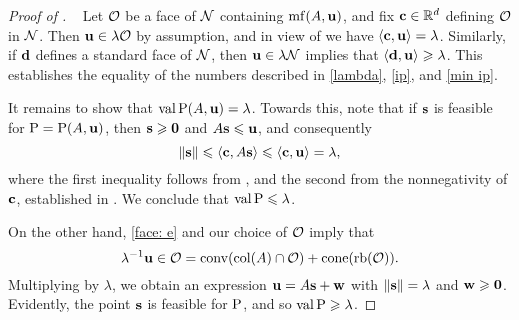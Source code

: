 \documentclass[11pt]{amsart}
\begin{document}
\begin{proof}[Proof of ]
   \ 
   Let $\mathcal{O}$ be a face of $\mathcal{N}$ containing $\operatorname{mf}(A,\mathbf{u})$, and fix $\mathbf{c} \in \mathbb{R}^d$ defining $\mathcal{O}$ in $\mathcal{N}$.
   Then $\mathbf{u} \in \lambda \mathcal{O}$ by assumption, and in view of  we have $\langle \mathbf{c}, \mathbf{u} \rangle = \lambda$.
   Similarly, if $\mathbf{d}$ defines a standard face of $\mathcal{N}$, then $\mathbf{u} \in \lambda \mathcal{N}$ implies that $\langle \mathbf{d}, \mathbf{u} \rangle \geqslant \lambda$.
   This establishes the equality of the numbers described in \eqref{lambda}, \eqref{ip}, and \eqref{min ip}.

   It remains to show that $\operatorname{val} \mathrm{P}(A, \mathbf{u}) = \lambda$.
   Towards this, note that if $\mathbf{s}$ is feasible for $\mathrm{P} = \mathrm{P}(A, \mathbf{u})$, then $\mathbf{s}\geqslant \mathbf{0}$ and $A \mathbf{s} \leqslant \mathbf{u}$, and consequently
   \[\| \mathbf{s} \| \leqslant \langle \mathbf{c}, A \mathbf{s} \rangle \leqslant \langle \mathbf{c}, \mathbf{u} \rangle = \lambda,\]
   where the first inequality follows from , and the second from the nonnegativity of $\mathbf{c}$, established in .
   We conclude that $\operatorname{val} \mathrm{P} \leqslant \lambda$.

   On the other hand, \eqref{face: e} and our choice of $\mathcal{O}$ imply that
   \begin{equation}\label{cone containment: e}
      \lambda^{-1} \mathbf{u} \in \mathcal{O} = \operatorname{conv}(\operatorname{col}(A) \cap \mathcal{O}) + \operatorname{cone}(\operatorname{rb}(\mathcal{O})).
   \end{equation}
   Multiplying by $\lambda$, we obtain an expression $\mathbf{u} = A \mathbf{s} + \mathbf{w}$ with $\| \mathbf{s} \| = \lambda$ and $\mathbf{w} \geqslant \mathbf{0}$.
   Evidently, the point $\mathbf{s}$ is feasible for $\mathrm{P}$, and so $\operatorname{val} \mathrm{P} \geqslant \lambda$.
\end{proof}
\end{document}

